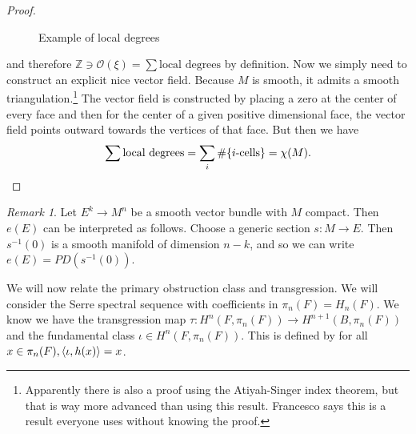 \documentclass[leqno, openany]{memoir}
\theoremstyle{definition}
\theoremstyle{remark}
\newtheorem{rmk}[thm]{Remark}
\theoremstyle{plain}
\theoremstyle{definition}
\theoremstyle{remark}
\newcommand{\Z}{\mathbb{Z}}
\newcommand{\mc}[1]{\mathcal{#1}}
\begin{document}
\begin{proof}
\begin{figure}[htpb]
\begin{center}
        \end{center}
        \caption{Example of local degrees}%
        \label{fig:locdeg}
        \end{figure}
    and therefore $\Z \ni \mc{O}(\xi) = \sum \text{local degrees}$ by definition. Now we simply need to construct an explicit nice vector field. Because $M$ is smooth, it admits a smooth triangulation.\footnote{Apparently there is also a proof using the Atiyah-Singer index theorem, but that is way more advanced than using this result. Francesco says this is a result everyone uses without knowing the proof.} The vector field is constructed by placing a zero at the center of every face and then for the center of a given positive dimensional face, the vector field points outward towards the vertices of that face. But then we have
    \[ \sum \text{local degrees} = \sum_i \#\qty{\text{$i$-cells}} = \chi(M). \qedhere \]
\end{proof}

\begin{rmk}
    Let $E^k \to M^n$ be a smooth vector bundle with $M$ compact. Then $e(E)$ can be interpreted as follows. Choose a generic section $s \colon M \to E$. Then $s^{-1}(0)$ is a smooth manifold of dimension $n-k$, and so we can write $e(E) = PD(s^{-1}(0))$.
\end{rmk}

We will now relate the primary obstruction class and transgression. We will consider the Serre spectral sequence with coefficients in $\pi_n(F) = H_n(F)$. We know we have the transgression map $\tau \colon H^n(F, \pi_n(F)) \to H^{n+1}(B, \pi_n(F))$ and the fundamental class $\iota \in H^n(F, \pi_n(F))$. This is defined by for all $x \in \pi_n(F), \ev{\iota, h(x)} = x$.
\end{document}

